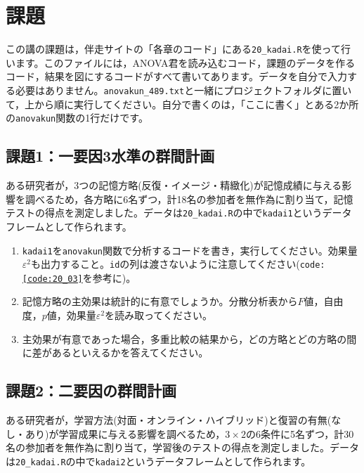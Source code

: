 \documentclass{ltjbook}
\begin{document}
\section{課題}

この講の課題は，伴走サイトの「各章のコード」にある\texttt{20\_kadai.R}を使って行います。このファイルには，ANOVA君を読み込むコード，課題のデータを作るコード，結果を図にするコードがすべて書いてあります。データを自分で入力する必要はありません。\texttt{anovakun\_489.txt}と一緒にプロジェクトフォルダに置いて，上から順に実行してください。自分で書くのは，「ここに書く」とある2か所の\verb|anovakun|関数の1行だけです。

\subsection{課題1：一要因3水準の群間計画}
ある研究者が，3つの記憶方略(反復・イメージ・精緻化)が記憶成績に与える影響を調べるため，各方略に6名ずつ，計18名の参加者を無作為に割り当て，記憶テストの得点を測定しました。データは\texttt{20\_kadai.R}の中で\texttt{kadai1}というデータフレームとして作られます。

\begin{enumerate}
	\item \texttt{kadai1}を\verb|anovakun|関数で分析するコードを書き，実行してください。効果量$\varepsilon^2$も出力すること。\texttt{id}の列は渡さないように注意してください(\texttt{code:\ref{code:20_03}}を参考に)。
	\item 記憶方略の主効果は統計的に有意でしょうか。分散分析表から$F$値，自由度，$p$値，効果量$\varepsilon^2$を読み取ってください。
	\item 主効果が有意であった場合，多重比較の結果から，どの方略とどの方略の間に差があるといえるかを答えてください。
\end{enumerate}

\subsection{課題2：二要因の群間計画}
ある研究者が，学習方法(対面・オンライン・ハイブリッド)と復習の有無(なし・あり)が学習成果に与える影響を調べるため，$3 \times 2$の6条件に5名ずつ，計30名の参加者を無作為に割り当て，学習後のテストの得点を測定しました。データは\texttt{20\_kadai.R}の中で\texttt{kadai2}というデータフレームとして作られます。
\end{document}
